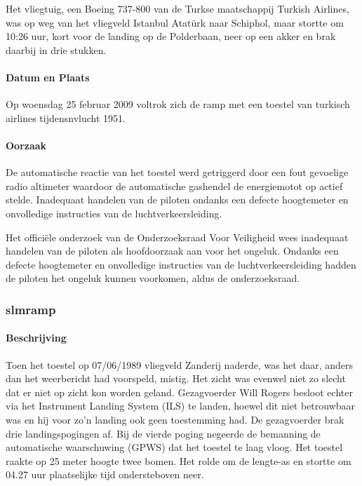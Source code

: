 \documentclass{article}
\begin{document}
	Het vliegtuig, een Boeing 737-800 van de Turkse maatschappij Turkish Airlines, was op weg van het vliegveld Istanbul Atatürk naar Schiphol, maar stortte om 10:26 uur,  kort voor de landing op de Polderbaan, neer op een akker en brak daarbij in drie stukken. 
	
	
	\paragraph{Datum en Plaats}
	
	\newline \indent  Op woensdag 25 februar 2009 voltrok zich de  ramp met een toestel van turkisch airlines tijdensnvlucht 1951.
	\paragraph{Oorzaak}
	De automatische reactie van het toestel werd getriggerd door een fout gevoelige radio altimeter waardoor de automatische gashendel de energiemotot op actief stelde.
	Inadequaat handelen van de piloten ondanks een defecte hoogtemeter en onvolledige instructies van de luchtverkeersleiding.
	
	Het officiële onderzoek van de Onderzoeksraad Voor Veiligheid wees inadequaat handelen van de piloten als hoofdoorzaak aan voor het ongeluk. Ondanks een defecte hoogtemeter en onvolledige instructies van de luchtverkeersleiding hadden de piloten het ongeluk kunnen voorkomen, aldus de onderzoeksraad.
	\subsubsection{slmramp}
	\paragraph{Beschrijving}
	Toen het toestel op 07/06/1989 vliegveld Zanderij naderde, was het daar, anders dan het weerbericht had voorspeld, mistig. Het zicht was evenwel niet zo slecht dat er niet op zicht kon worden geland. Gezagvoerder Will Rogers besloot echter via het Instrument Landing System (ILS) te landen, hoewel dit niet betrouwbaar was en hij voor zo'n landing ook geen toestemming had. De gezagvoerder brak drie landingspogingen af. Bij de vierde poging negeerde de bemanning de automatische waarschuwing (GPWS) dat het toestel te laag vloog. Het toestel raakte op 25 meter hoogte twee bomen. Het rolde om de lengte-as en stortte om 04.27 uur plaatselijke tijd ondersteboven neer.
\end{document}
